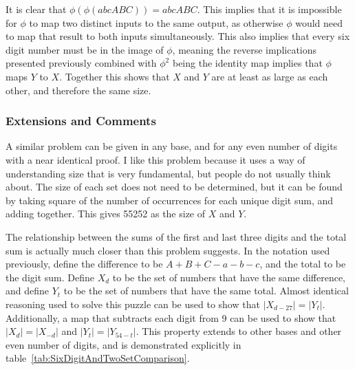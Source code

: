 It is clear that $\phi(\phi(abcABC)) = abcABC$. This implies that it is impossible for $\phi$ to map two distinct inputs to the same output, as otherwise $\phi$ would need to map that result to both inputs simultaneously. This also implies that every six digit number must be in the image of $\phi$, meaning the reverse implications presented previously combined with $\phi^2$ being the identity map implies that $\phi$ maps $Y$ to $X$. Together this shows that $X$ and $Y$ are at least as large as each other, and therefore the same size.

\subsubsection{Extensions and Comments}

A similar problem can be given in any base, and for any even number of digits with a near identical proof. I like this problem because it uses a way of understanding size that is very fundamental, but people do not usually think about. The size of each set does not need to be determined, but it can be found by taking square of the number of occurrences for each unique digit sum, and adding together. This gives 55252 as the size of $X$ and $Y$.

The relationship between the sums of the first and last three digits and the total sum is actually much closer than this problem suggests. In the notation used previously, define the difference to be $A + B +C - a - b -c$, and the total to be the digit sum. Define $X_d$ to be the set of numbers that have the same difference, and define $Y_t$ to be the set of numbers that have the same total. Almost identical reasoning used to solve this puzzle can be used to show that $|X_{d-27}| = |Y_t|$. Additionally, a map that subtracts each digit from 9 can be used to show that $|X_d| = |X_{-d}|$ and $|Y_t| = |Y_{54 - t}|$. This property extends to other bases and other even number of digits, and is demonstrated explicitly in table~\ref{tab:SixDigitAndTwoSetComparison}.

